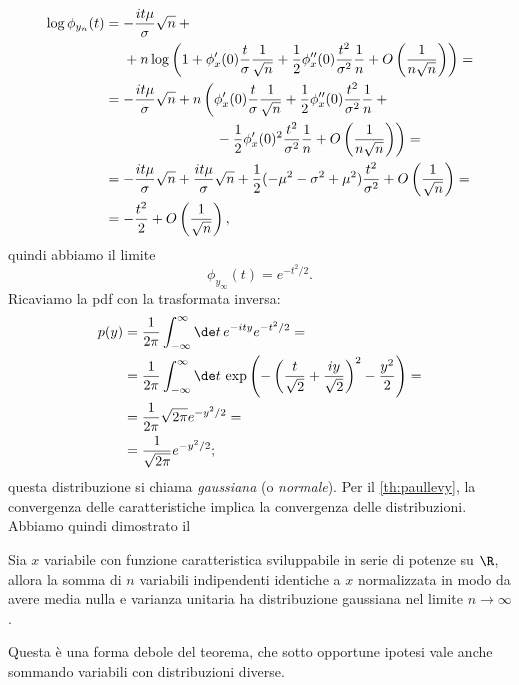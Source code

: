 \begin{align*}
	\log\phi_{y_n}(t)
	&= -\frac{it\mu}{\sigma}\sqrt n + {} \\
	&\phantom{{}={}} + n \log\left(1 + \phi_x'(0) \frac t\sigma \frac1{\sqrt n}
	+ \frac12 \phi_x''(0) \frac{t^2}{\sigma^2} \frac1n
	+ O\left(\frac1{n\sqrt n}\right) \right) = \\
	&= -\frac{it\mu}{\sigma}\sqrt n
	+ n \left( \phi_x'(0) \frac t\sigma \frac1{\sqrt n}
	+ \frac12 \phi_x''(0) \frac{t^2}{\sigma^2} \frac 1n + {}\right. \\
	&\left.\phantom{= -\frac{it\mu}{\sigma}\sqrt n + n\left(\vphantom{\frac1{\sqrt n}}\right.}
	- \frac12 \phi_x'(0)^2 \frac{t^2}{\sigma^2} \frac 1n 
	+ O\left(\frac1{n\sqrt n}\right) \right) = \\
	&= -\frac{it\mu}{\sigma}\sqrt n
	+ \frac{it\mu}{\sigma}\sqrt n
	+ \frac12 (-\mu^2 - \sigma^2 + \mu^2) \frac{t^2}{\sigma^2} + O\left(\frac1{\sqrt n}\right) = \\
	&= -\frac{t^2}2 + O\left(\frac1{\sqrt n}\right),
\end{align*}
quindi abbiamo il limite
\begin{equation*}
	\phi_{y_\infty}(t) = e^{-t^2/2}.
\end{equation*}
Ricaviamo la pdf con la trasformata inversa:
\begin{align*}
	p(y)
	&= \frac1{2\pi} \int_{-\infty}^\infty \de t\, e^{-ity} e^{-t^2/2} = \\
	&= \frac1{2\pi} \int_{-\infty}^\infty \de t\,
	\exp\left( -\left(\frac t{\sqrt 2} + \frac{iy}{\sqrt 2}\right)^2 - \frac{y^2}2 \right) = \\
	&= \frac1{2\pi} \sqrt{2\pi} e^{-y^2/2} = \\
	&= \frac1{\sqrt{2\pi}} e^{-y^2/2};
\end{align*}
questa distribuzione si chiama \emph{gaussiana} (o \emph{normale}).
Per il \autoref{th:paullevy},
la convergenza delle caratteristiche implica la convergenza delle distribuzioni.
Abbiamo quindi dimostrato il
\begin{theorem}
	\label{th:limitecentrale}
	Sia $x$ variabile con funzione caratteristica sviluppabile in serie di potenze su $\R$,
	allora la somma di $n$ variabili indipendenti identiche a $x$ normalizzata in modo da avere media nulla e varianza unitaria ha distribuzione gaussiana nel limite $n\to\infty$.
\end{theorem}
Questa è una forma debole del teorema, che sotto opportune ipotesi vale anche sommando variabili con distribuzioni diverse.

